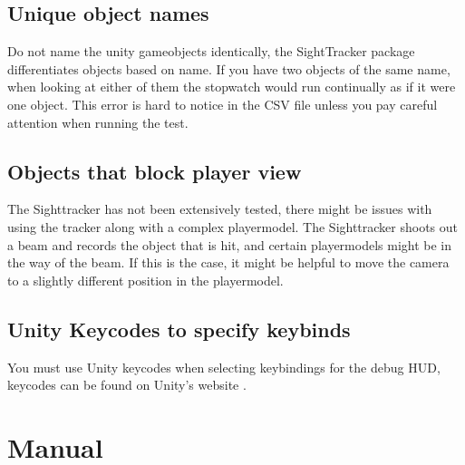 \documentclass[letterpaper]{article}
\begin{document}
\subsection{Unique object names}
Do not name the unity gameobjects identically, the SightTracker package differentiates objects based on name. If you have two objects of the same name, when looking at either of them the stopwatch would run continually as if it were one object. This error is hard to notice in the CSV file unless you pay careful attention when running the test.
\subsection{Objects that block player view}
The Sighttracker has not been extensively tested, there might be issues with using the tracker along with a complex playermodel. The Sighttracker shoots out a beam and records the object that is hit, and certain playermodels might be in the way of the beam. If this is the case, it might be helpful to move the camera to a slightly different position in the playermodel.
\subsection{Unity Keycodes to specify keybinds}
You must use Unity keycodes when selecting keybindings for the debug HUD, keycodes can be found on Unity's website \cite{unitykeycode}.
\newpage
\section{Manual}
\end{document}
